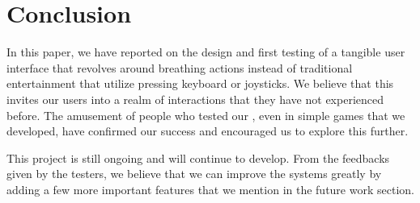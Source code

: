 \section{Conclusion}\label{sec:conc}

In this paper, we have reported on the design and first testing of a tangible user interface that revolves around breathing actions instead of traditional entertainment that utilize pressing keyboard or joysticks. We believe that this invites our users into a realm of interactions that they have not experienced before. The amusement of people who tested our \tube, even in simple games that we developed, have confirmed our success and encouraged us to explore this further.

This project is still ongoing and will continue to develop. From the feedbacks given by the testers, we believe that we can improve the systems greatly by adding a few more important features that we mention in the future work section.